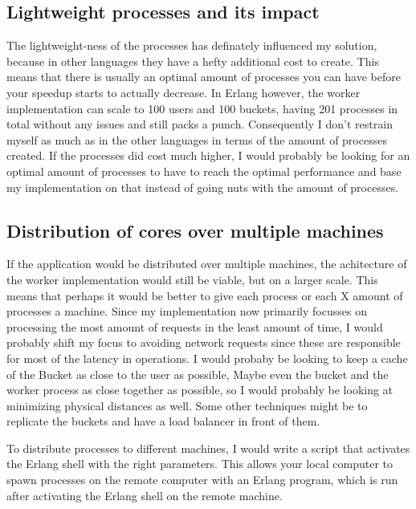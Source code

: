 \documentclass{article}
\begin{document}
\subsection{Lightweight processes and its impact}
The lightweight-ness of the processes has definately influenced my solution,
because in other languages they have a hefty additional cost to create. This
means that there is usually an optimal amount of processes you can have before
your speedup starts to actually decrease. In Erlang however, the
worker implementation can scale to 100 users and 100 buckets, having 201
processes in total without any issues and still packs a punch. Consequently
I don't restrain myself as much as in the other languages in terms of the amount of processes created.
If the processes did cost much higher, I would probably be looking for an
optimal amount of processes to have to reach the optimal performance and base my
implementation on that instead of going nuts with the amount of processes.
\subsection{Distribution of cores over multiple machines}
If the application would be distributed over multiple machines, the achitecture
of the worker implementation would still be viable, but on a larger scale. This
means that perhaps it would be better to give each process or each X amount of
processes a machine. Since my implementation now primarily focusses on
processing the most amount of requests in the least amount of time, I would
probably shift my focus to avoiding network requests since these are responsible
for most of the
latency in operations. I would probaby be looking to keep a cache of the Bucket
as close to the user as possible, Maybe even the bucket and the worker process
as close together as possible, so I would probably be looking at minimizing physical
distances as well. Some other techniques might be to replicate the buckets and have a
load balancer in front of them. \par
To distribute processes to different machines, I would write a script that
activates the Erlang shell with the right parameters. This allows your local
computer to spawn processes on the remote computer with an Erlang program, which
is run after activating the Erlang shell on the remote machine.
\end{document}
